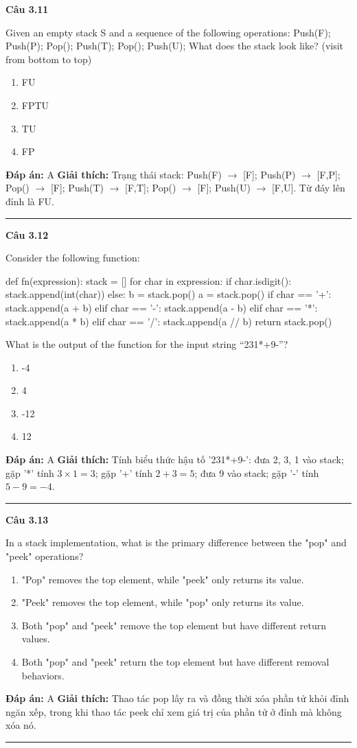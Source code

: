 \documentclass[11pt,a4paper]{article}
\newenvironment{question}[1]{%
  \par\vspace{1em}\noindent\textbf{\large Câu #1}\par\vspace{0.4em}
}{%
  \par\vspace{1em}\hrule\vspace{0.6em}
}
\newenvironment{choices}{%
  \begin{enumerate}[label=\textbf{\Alph*.},leftmargin=2.2em,itemsep=2pt,topsep=3pt]
}{%
  \end{enumerate}
}
\newcommand{\choice}{\item}
\newenvironment{codebox}{%
  \begin{tcolorbox}[colback=gray!8!white,colframe=gray!50!black,arc=1.5mm,boxrule=0.6pt,left=3mm,right=3mm,top=2.5mm,bottom=2.5mm]
  \ttfamily\small
}{%
  \end{tcolorbox}
}
\begin{document}
\begin{question}{3.11}
Given an empty stack S and a sequence of the following operations: Push(F); Push(P); Pop(); Push(T); Pop(); Push(U); What does the stack look like? (visit from bottom to top)
\begin{choices}
\choice FU
\choice FPTU
\choice TU
\choice FP
\end{choices}
\textbf{Đáp án:} A
\textbf{Giải thích:} Trạng thái stack: Push(F) \(\to\) [F]; Push(P) \(\to\) [F,P]; Pop() \(\to\) [F]; Push(T) \(\to\) [F,T]; Pop() \(\to\) [F]; Push(U) \(\to\) [F,U]. Từ đáy lên đỉnh là FU.
\end{question}

\begin{question}{3.12}
Consider the following function:
\begin{codebox}
def fn(expression):
    stack = []
    for char in expression:
        if char.isdigit():
            stack.append(int(char))
        else:
            b = stack.pop()
            a = stack.pop()
            if char == '+':
                stack.append(a + b)
            elif char == '-':
                stack.append(a - b)
            elif char == '*':
                stack.append(a * b)
            elif char == '/':
                stack.append(a // b)
    return stack.pop()
\end{codebox}
What is the output of the function for the input string ``231*+9-''?
\begin{choices}
\choice -4
\choice 4
\choice -12
\choice 12
\end{choices}
\textbf{Đáp án:} A
\textbf{Giải thích:} Tính biểu thức hậu tố '231*+9-': đưa 2, 3, 1 vào stack; gặp '*' tính \(3 \times 1 = 3\); gặp '+' tính \(2 + 3 = 5\); đưa 9 vào stack; gặp '-' tính \(5 - 9 = -4\).
\end{question}

\begin{question}{3.13}
In a stack implementation, what is the primary difference between the "pop" and "peek" operations?
\begin{choices}
\choice "Pop" removes the top element, while "peek" only returns its value.
\choice "Peek" removes the top element, while "pop" only returns its value.
\choice Both "pop" and "peek" remove the top element but have different return values.
\choice Both "pop" and "peek" return the top element but have different removal behaviors.
\end{choices}
\textbf{Đáp án:} A
\textbf{Giải thích:} Thao tác pop lấy ra và đồng thời xóa phần tử khỏi đỉnh ngăn xếp, trong khi thao tác peek chỉ xem giá trị của phần tử ở đỉnh mà không xóa nó.
\end{question}
\end{document}
